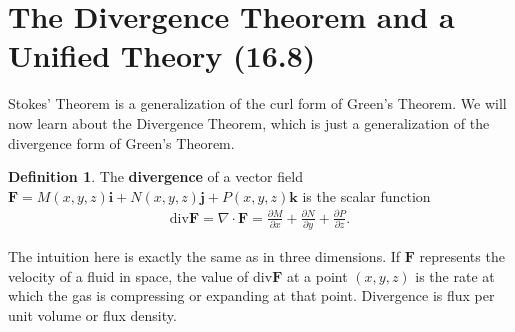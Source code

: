 \documentclass[12pt, letter]{article}
\theoremstyle{plain}
\numberwithin{theorem}{section}
\theoremstyle{definition}
\newtheorem{definition}[theorem]{Definition}
\begin{document}
\newpage


\section{The Divergence Theorem and a Unified Theory (16.8)}

Stokes' Theorem is a generalization of the curl form of Green's Theorem. We will now learn about the Divergence Theorem, which is just a generalization of the divergence form of Green's Theorem.

\bigskip

\begin{definition}
The \textbf{divergence} of a vector field $\bm{F} = M(x,y,z)\bm{i}+N(x,y,z)\bm{j}+P(x,y,z)\bm{k}$ is the scalar function
\begin{align*}
\text{div} \bm{F} = \nabla \cdot \bm{F} = \frac{\partial M}{\partial x}+\frac{\partial N}{\partial y}+\frac{\partial P}{\partial z}.
\end{align*}
\end{definition}

\bigskip

The intuition here is exactly the same as in three dimensions. If $\bm{F}$ represents the velocity of a fluid in space, the value of $\text{div}\bm{F}$ at a point $(x,y,z)$ is the rate at which the gas is compressing or expanding at that point. Divergence is flux per unit volume or flux density.

\bigskip

\hrulefill

\bigskip
\end{document}
